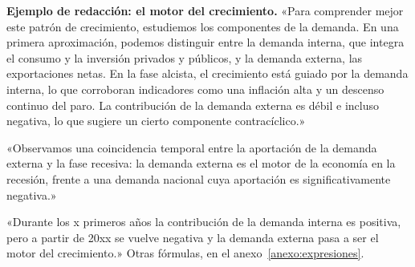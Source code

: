 \documentclass[11pt]{article}
\begin{document}
\begin{anotaciones}
\textbf{Ejemplo de redacción: el motor del crecimiento.}
«Para comprender mejor este patrón de crecimiento, estudiemos los componentes de la demanda. En una primera aproximación, podemos distinguir entre la demanda interna, que integra el consumo y la inversión privados y públicos, y la demanda externa, las exportaciones netas. En la fase alcista, el crecimiento está guiado por la demanda interna, lo que corroboran indicadores como una inflación alta y un descenso continuo del paro. La contribución de la demanda externa es débil e incluso negativa, lo que sugiere un cierto componente contracíclico.»

«Observamos una coincidencia temporal entre la aportación de la demanda externa y la fase recesiva: la demanda externa es el motor de la economía en la recesión, frente a una demanda nacional cuya aportación es significativamente negativa.»

«Durante los x primeros años la contribución de la demanda interna es positiva, pero a partir de 20xx se vuelve negativa y la demanda externa pasa a ser el motor del crecimiento.» Otras fórmulas, en el anexo~\ref{anexo:expresiones}.
\end{anotaciones}
\end{document}
